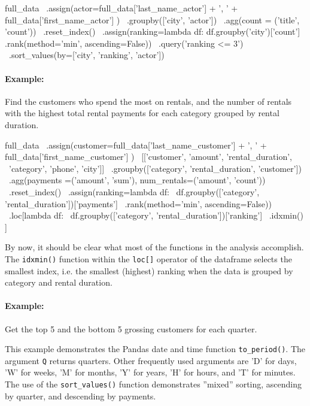 \begin{pythoncode}
full_data \
   .assign(actor=full_data['last_name_actor'] + ', ' + 
                 full_data['first_name_actor'] ) \
   .groupby(['city', 'actor']) \
   .agg(count = ('title', 'count')) \
   .reset_index() \
   .assign(ranking=lambda df: 
      df.groupby('city')['count']
        .rank(method='min', ascending=False)) \
   .query('ranking <= 3') \
   .sort_values(by=['city', 'ranking', 'actor'])
\end{pythoncode}

\paragraph*{Example:} Find the customers who spend the most on rentals, and the number of rentals with the highest total rental payments for each category grouped by rental duration.

\begin{pythoncode}
full_data \
   .assign(customer=full_data['last_name_customer'] + ', ' + 
                    full_data['first_name_customer'] ) \
   [['customer', 'amount', 'rental_duration', \
     'category', 'phone', 'city']] \
   .groupby(['category', 'rental_duration', 'customer']) \
   .agg(payments =('amount', 'sum'), 
        num_rentals=('amount', 'count')) \
   .reset_index() \
   .assign(ranking=lambda df: \
      df.groupby(['category', 'rental_duration'])['payments'] \
        .rank(method='min', ascending=False)) \
    .loc[lambda df:  \
         df.groupby(['category', 'rental_duration'])['ranking'] \
           .idxmin() ]
\end{pythoncode}

By now, it should be clear what most of the functions in the analysis accomplish. The \texttt{idxmin()} function within the \texttt{loc[]} operator of the dataframe selects the smallest index, i.e. the smallest (highest) ranking when the data is grouped by category and rental duration.

\paragraph*{Example:} Get the top 5 and the bottom 5 grossing customers for each quarter.

This example demonstrates the Pandas date and time function \texttt{to\_period()}. The argument \texttt{Q} returns quarters. Other frequently used arguments are 'D' for days, 'W' for weeks, 'M' for months, 'Y' for years, 'H' for hours, and 'T' for minutes. The use of the \texttt{sort\_values()} function demonstrates ''mixed'' sorting, ascending by quarter, and descending by payments.

